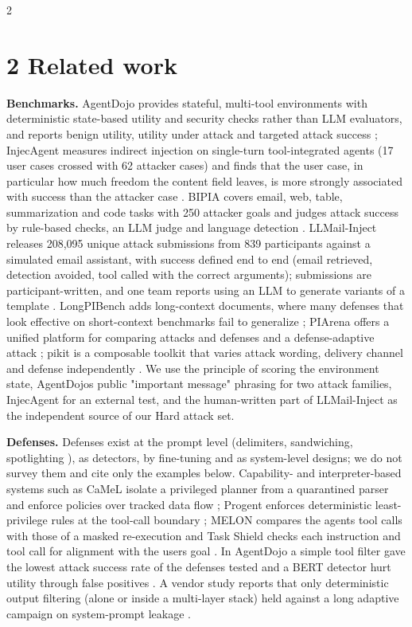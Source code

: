 \documentclass[9pt]{extarticle}
\begin{document}
\begin{multicols}{2}
\section{2 Related work}

\textbf{Benchmarks.} AgentDojo provides stateful, multi-tool environments with deterministic state-based utility and security checks rather than LLM evaluators, and reports benign utility, utility under attack and targeted attack success \cite{arxiv2406_13352}; InjecAgent measures indirect injection on single-turn tool-integrated agents (17 user cases crossed with 62 attacker cases) and finds that the user case, in particular how much freedom the content field leaves, is more strongly associated with success than the attacker case \cite{arxiv2403_02691}. BIPIA covers email, web, table, summarization and code tasks with 250 attacker goals and judges attack success by rule-based checks, an LLM judge and language detection \cite{arxiv2312_14197}. LLMail-Inject releases 208,095 unique attack submissions from 839 participants against a simulated email assistant, with success defined end to end (email retrieved, detection avoided, tool called with the correct arguments); submissions are participant-written, and one team reports using an LLM to generate variants of a template \cite{arxiv2506_09956}. LongPIBench adds long-context documents, where many defenses that look effective on short-context benchmarks fail to generalize \cite{arxiv2608_28411}; PIArena offers a unified platform for comparing attacks and defenses and a defense-adaptive attack \cite{arxiv2604_08499}; pikit is a composable toolkit that varies attack wording, delivery channel and defense independently \cite{arxiv2609_36817}. We use the principle of scoring the environment state, AgentDojo\textquotesingle s public "important message" phrasing for two attack families, InjecAgent for an external test, and the human-written part of LLMail-Inject as the independent source of our Hard attack set.

\textbf{Defenses.} Defenses exist at the prompt level (delimiters, sandwiching, spotlighting \cite{arxiv2403_14720}), as detectors, by fine-tuning and as system-level designs; we do not survey them and cite only the examples below. Capability- and interpreter-based systems such as CaMeL isolate a privileged planner from a quarantined parser and enforce policies over tracked data flow \cite{arxiv2503_18813}; Progent enforces deterministic least-privilege rules at the tool-call boundary \cite{arxiv2504_11703}; MELON compares the agent\textquotesingle s tool calls with those of a masked re-execution and Task Shield checks each instruction and tool call for alignment with the user\textquotesingle s goal \cite{arxiv2502_05174,arxiv2412_16682}. In AgentDojo a simple tool filter gave the lowest attack success rate of the defenses tested and a BERT detector hurt utility through false positives \cite{arxiv2406_13352}. A vendor study reports that only deterministic output filtering (alone or inside a multi-layer stack) held against a long adaptive campaign on system-prompt leakage \cite{arxiv2604_23887}.


\end{multicols}
\end{document}
